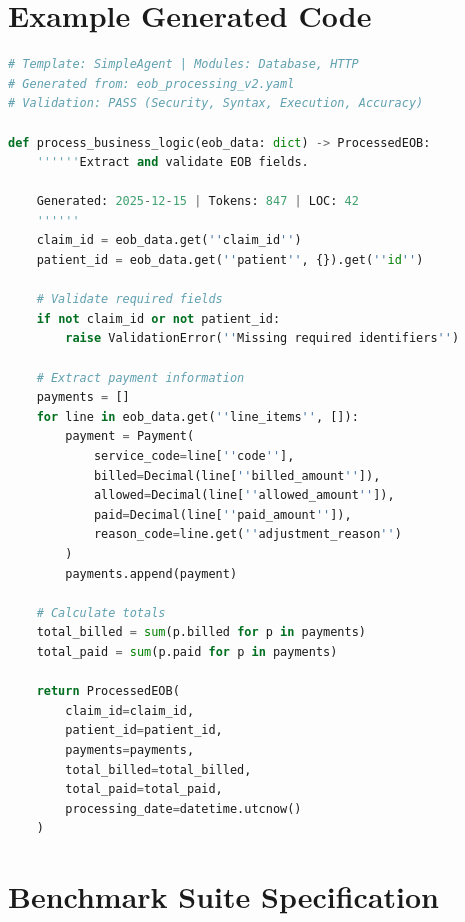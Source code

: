 \documentclass[11pt]{article}
\begin{document}

\appendix

\section{Example Generated Code}
\label{app:example}

\begin{lstlisting}[language=Python, caption={Generated Temporal activity (business logic only)}, basicstyle=\small\ttfamily]
# Template: SimpleAgent | Modules: Database, HTTP
# Generated from: eob_processing_v2.yaml
# Validation: PASS (Security, Syntax, Execution, Accuracy)

def process_business_logic(eob_data: dict) -> ProcessedEOB:
    ''''''Extract and validate EOB fields.
    
    Generated: 2025-12-15 | Tokens: 847 | LOC: 42
    ''''''
    claim_id = eob_data.get(''claim_id'')
    patient_id = eob_data.get(''patient'', {}).get(''id'')
    
    # Validate required fields
    if not claim_id or not patient_id:
        raise ValidationError(''Missing required identifiers'')
    
    # Extract payment information
    payments = []
    for line in eob_data.get(''line_items'', []):
        payment = Payment(
            service_code=line[''code''],
            billed=Decimal(line[''billed_amount'']),
            allowed=Decimal(line[''allowed_amount'']),
            paid=Decimal(line[''paid_amount'']),
            reason_code=line.get(''adjustment_reason'')
        )
        payments.append(payment)
    
    # Calculate totals
    total_billed = sum(p.billed for p in payments)
    total_paid = sum(p.paid for p in payments)
    
    return ProcessedEOB(
        claim_id=claim_id,
        patient_id=patient_id,
        payments=payments,
        total_billed=total_billed,
        total_paid=total_paid,
        processing_date=datetime.utcnow()
    )
\end{lstlisting}

\section{Benchmark Suite Specification}
\label{app:benchmark}
\end{document}
